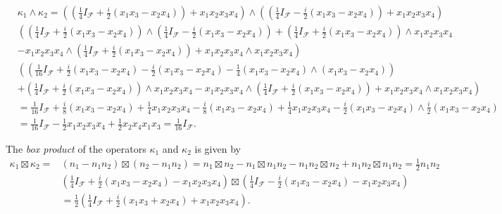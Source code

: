 \documentclass[aps,preprint]{revtex4}%
\begin{document}
\begin{align}
&  \kappa_{1}\wedge\kappa_{2}=\left(  \left(  \frac{1}{4}I_{\mathcal{F}}%
+\frac{i}{2}\left(  x_{1}x_{3}-x_{2}x_{4}\right)  \right)  +x_{1}x_{2}%
x_{3}x_{4}\right)  \wedge\left(  \left(  \frac{1}{4}I_{\mathcal{F}}-\frac
{i}{2}\left(  x_{1}x_{3}-x_{2}x_{4}\right)  \right)  +x_{1}x_{2}x_{3}%
x_{4}\right)  \\
&  \left(  \left(  \frac{1}{4}I_{\mathcal{F}}+\frac{i}{2}\left(  x_{1}%
x_{3}-x_{2}x_{4}\right)  \right)  \wedge\left(  \frac{1}{4}I_{\mathcal{F}%
}-\frac{i}{2}\left(  x_{1}x_{3}-x_{2}x_{4}\right)  \right)  +\left(  \frac
{1}{4}I_{\mathcal{F}}+\frac{i}{2}\left(  x_{1}x_{3}-x_{2}x_{4}\right)
\right)  \wedge x_{1}x_{2}x_{3}x_{4}\right.  \\
&  \left.  -x_{1}x_{2}x_{3}x_{4}\wedge\left(  \frac{1}{4}I_{\mathcal{F}}%
+\frac{i}{2}\left(  x_{1}x_{3}-x_{2}x_{4}\right)  \right)  +x_{1}x_{2}%
x_{3}x_{4}\wedge x_{1}x_{2}x_{3}x_{4}\right)  \\
&  \left(  \left(  \frac{1}{16}I_{\mathcal{F}}+\frac{i}{2}\left(  x_{1}%
x_{3}-x_{2}x_{4}\right)  -\frac{i}{2}\left(  x_{1}x_{3}-x_{2}x_{4}\right)
-\frac{1}{4}\left(  x_{1}x_{3}-x_{2}x_{4}\right)  \wedge\left(  x_{1}%
x_{3}-x_{2}x_{4}\right)  \right)  \right.  \\
&  \left.  +\left(  \frac{1}{4}I_{\mathcal{F}}+\frac{i}{2}\left(  x_{1}%
x_{3}-x_{2}x_{4}\right)  \right)  \wedge x_{1}x_{2}x_{3}x_{4}-x_{1}x_{2}%
x_{3}x_{4}\wedge\left(  \frac{1}{4}I_{\mathcal{F}}+\frac{i}{2}\left(
x_{1}x_{3}-x_{2}x_{4}\right)  \right)  +x_{1}x_{2}x_{3}x_{4}\wedge x_{1}%
x_{2}x_{3}x_{4}\right)  \\
&  =\frac{1}{16}I_{\mathcal{F}}+\frac{i}{8}\left(  x_{1}x_{3}-x_{2}%
x_{4}\right)  +\frac{1}{4}x_{1}x_{2}x_{3}x_{4}-\frac{i}{8}\left(  x_{1}%
x_{3}-x_{2}x_{4}\right)  +\frac{1}{4}x_{1}x_{2}x_{3}x_{4}-\frac{i}{2}\left(
x_{1}x_{3}-x_{2}x_{4}\right)  \wedge\frac{i}{2}\left(  x_{1}x_{3}-x_{2}%
x_{4}\right)  \\
&  =\frac{1}{16}I_{\mathcal{F}}-\frac{1}{2}x_{1}x_{2}x_{3}x_{4}+\frac{1}%
{2}x_{2}x_{4}x_{1}x_{3}=\frac{1}{16}I_{\mathcal{F}}.
\end{align}


The \emph{box product }of the operators $\kappa_{1}$ and $\kappa_{2}$ is given
by
\begin{align}
\kappa_{1}\boxtimes\kappa_{2}= &  \left(  n_{1}-n_{1}n_{2}\right)
\boxtimes\left(  n_{2}-n_{1}n_{2}\right)  =n_{1}\boxtimes n_{2}-n_{1}\boxtimes
n_{1}n_{2}-n_{1}n_{2}\boxtimes n_{2}+n_{1}n_{2}\boxtimes n_{1}n_{2}=\frac
{1}{2}n_{1}n_{2}\\
&  \left(  \frac{1}{4}I_{\mathcal{F}}+\frac{i}{2}\left(  x_{1}x_{3}-x_{2}%
x_{4}\right)  -x_{1}x_{2}x_{3}x_{4}\right)  \boxtimes\left(  \frac{1}%
{4}I_{\mathcal{F}}-\frac{i}{2}\left(  x_{1}x_{3}-x_{2}x_{4}\right)
-x_{1}x_{2}x_{3}x_{4}\right)  \\
&  =\frac{1}{2}\left(  \frac{1}{4}I_{\mathcal{F}}+\frac{i}{2}\left(
x_{1}x_{3}+x_{2}x_{4}\right)  +x_{1}x_{2}x_{3}x_{4}\right)  .
\end{align}
\end{document}
